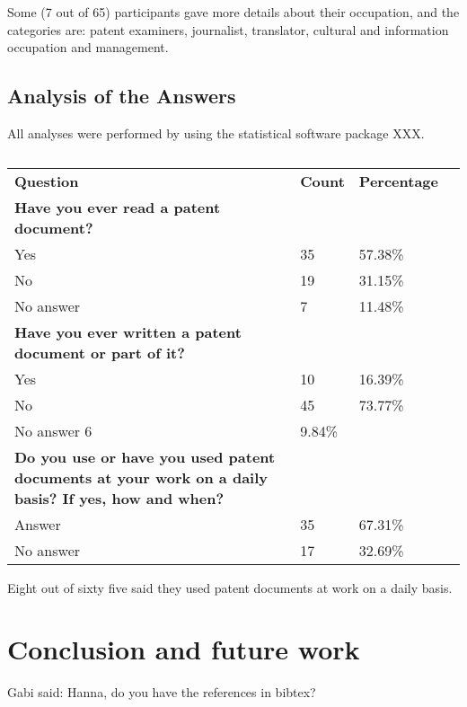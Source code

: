 \documentclass[11pt]{article}
\begin{document}
Some (7 out of 65) participants gave more details about their occupation, and the categories
are: patent examiners, journalist, translator, cultural and information occupation and management.




\subsection{Analysis of the Answers}
All analyses were performed by using the statistical software package XXX.


\begin{table}
\centering
\caption{}
\begin{small}
\begin{tabular}{p{8cm}lll}
\hline
\textbf{Question} 	& \textbf{Count}	& \textbf{Percentage} \\ 
\textbf{Have you ever read a patent document?}	& & 	\\ \hline 
Yes & 	35	& 57.38\% 	\\ 
No & 19	& 31.15\% 	\\ 
No answer	& 7	& 11.48\% 	\\ \hline		

\textbf{Have you ever written a patent document or part of it?}	& & \\	
Yes & 10	 & 16.39\% \\
No &	 45	& 73.77\% \\
No answer 6 &	9.84\% \\ \hline
		
\textbf{Do you use or have you used patent documents at your work on a daily basis? If yes, how and when?} & & \\
Answer	& 35	& 67.31\% \\ 
No answer	&  17	& 32.69\% \\ \hline
\end{tabular}
\end{small}
\label{•}
\end{table}


Eight out of sixty five  said they used patent documents at work on a daily basis.

\section{Conclusion and future work}



{\color{blue} Gabi said: Hanna, do you have the references in bibtex?}
\end{document}
